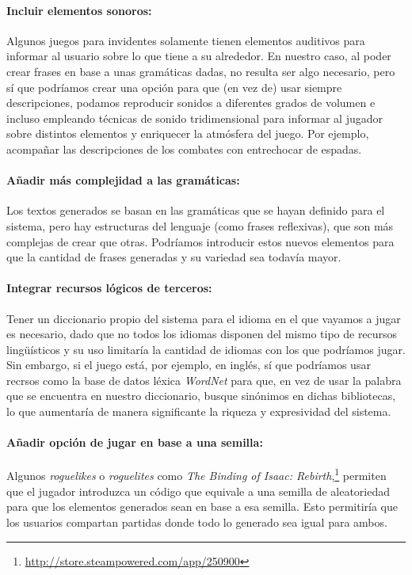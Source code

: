 \paragraph{Incluir elementos sonoros:} Algunos juegos para invidentes solamente tienen elementos auditivos para informar al usuario sobre lo que tiene a su alrededor. En nuestro caso, al poder crear frases en base a unas gramáticas dadas, no resulta ser algo necesario, pero sí que podríamos crear una opción para que (en vez de) usar siempre descripciones, podamos reproducir sonidos a diferentes grados de volumen e incluso empleando técnicas de sonido tridimensional para informar al jugador sobre distintos elementos y enriquecer la atmósfera del juego. Por ejemplo, acompañar las descripciones de los combates con entrechocar de espadas.

\paragraph{Añadir más complejidad a las gramáticas:} Los textos generados se basan en las gramáticas que se hayan definido para el sistema, pero hay estructuras del lenguaje (como frases reflexivas), que son más complejas de crear que otras. Podríamos introducir estos nuevos elementos para que la cantidad de frases generadas y su variedad sea todavía mayor. 

\paragraph{Integrar recursos lógicos de terceros:} Tener un diccionario propio del sistema para el idioma en el que vayamos a jugar es necesario, dado que no todos los idiomas disponen del mismo tipo de recursos lingüísticos y su uso limitaría la cantidad de idiomas con los que podríamos jugar. Sin embargo, si el juego está, por ejemplo, en inglés, sí que podríamos usar recrsos como la base de datos léxica \textit{WordNet} para que, en vez de usar la palabra que se encuentra en nuestro diccionario, busque sinónimos en dichas bibliotecas, lo que aumentaría de manera significante la riqueza y expresividad del sistema. 

\paragraph{Añadir opción de jugar en base a una semilla:} Algunos \textit{roguelikes} o \textit{roguelites} como \textit{The Binding of Isaac: Rebirth},\footnote{\url{http://store.steampowered.com/app/250900}} permiten que el jugador introduzca un código que equivale a una semilla de aleatoriedad para que los elementos generados sean en base a esa semilla. Esto permitiría que los usuarios compartan partidas donde todo lo generado sea igual para ambos.